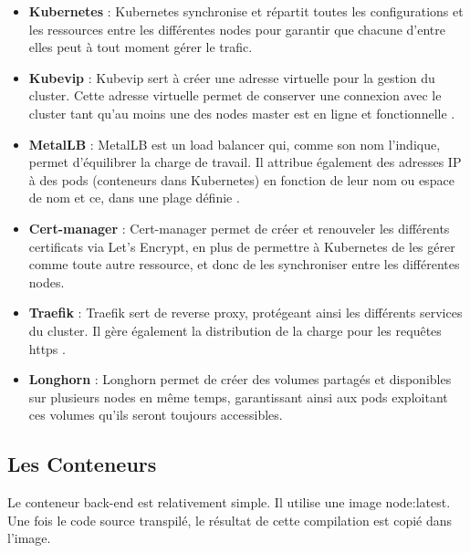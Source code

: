 \begin{itemize}
    \item \textbf{Kubernetes} : Kubernetes synchronise et répartit toutes les configurations et les ressources entre les différentes nodes
    pour garantir que chacune d'entre elles peut à tout moment gérer le trafic.\\

    \item \textbf{Kubevip} : Kubevip sert à créer une adresse virtuelle pour la gestion du cluster.
    Cette adresse virtuelle permet de conserver une connexion avec le cluster tant qu'au moins une des nodes master est en ligne et fonctionnelle .\\

    \item \textbf{MetalLB} : MetalLB est un load balancer qui, comme son nom l'indique, permet d'équilibrer la charge de travail.
    Il attribue également des adresses IP à des pods (conteneurs dans Kubernetes) en fonction de leur nom ou espace de nom et ce, dans une plage définie .\\

    \item \textbf{Cert-manager} : Cert-manager permet de créer et renouveler les différents certificats via Let's Encrypt,
    en plus de permettre à Kubernetes de les gérer comme toute autre ressource, et donc de les synchroniser entre les différentes nodes.\\


    \item \textbf{Traefik} : Traefik sert de reverse proxy, protégeant ainsi les différents services du cluster.
    Il gère également la distribution de la charge pour les requêtes \Gls{https} .\\
    \item \textbf{Longhorn} : Longhorn permet de créer des volumes partagés et disponibles sur plusieurs nodes en même temps,
    garantissant ainsi aux pods exploitant ces volumes qu'ils seront toujours accessibles.\\
\end{itemize}

\subsection{Les Conteneurs}\label{subsec:les-conteneurs}
Le conteneur back-end est relativement simple.
Il utilise une image node:latest.
Une fois le code source transpilé, le résultat de cette compilation est copié dans l'image.\\

